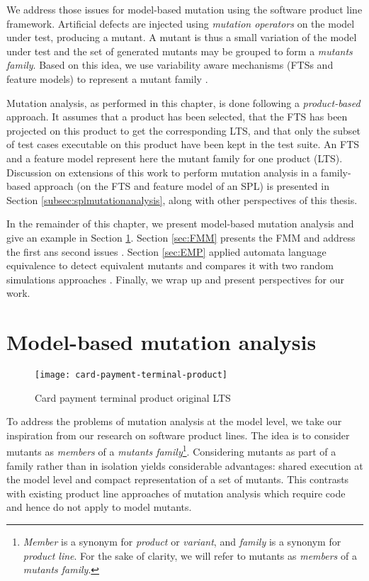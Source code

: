 We address those issues for model-based mutation using the software product line framework. Artificial defects are injected using \emph{mutation operators} on the model under test, producing a mutant. A mutant is thus a small variation of the model under test and the set of generated mutants may be grouped to form a \emph{mutants family}. Based on this idea, we use variability aware mechanisms (FTSs and feature models) to represent a mutant family \cite{Devroey2016a,Devroey2014f}. 

Mutation analysis, as performed in this chapter, is done following a \emph{product-based} approach. It assumes that a product has been selected, that the FTS has been projected on this product to get the corresponding \gls{LTS}, and that only the subset of test cases executable on this product have been kept in the test suite. An \gls{FTS} and a \gls{feature model} represent here the mutant family for one product (\ie LTS). Discussion on extensions of this work to perform mutation analysis in a family-based approach (\ie on the FTS and feature model of an SPL) is presented in Section \ref{subsec:splmutationanalysis}, along with other perspectives of this thesis.

In the remainder of this chapter, we present model-based mutation analysis and give an example in Section \ref{sec:MBMA}. Section \ref{sec:FMM} presents the \acrfull{FMM} and address the first ans second issues \cite{Devroey2016a}. Section \ref{sec:EMP} applied automata language equivalence to detect equivalent mutants and compares it with two random simulations approaches \cite{Devroey2017}. Finally, we wrap up and present perspectives for our work. 

\section{Model-based mutation analysis}

\label{sec:MBMA}

\begin{figure}[t]
	\centering
	\texttt{[image: card-payment-terminal-product]}
	\caption{Card payment terminal product original LTS}
	\label{fig:fmm:cptproduct}
\end{figure}

To address the problems of mutation analysis at the model level, we take our inspiration from our research on software product lines. The idea is to consider mutants as \emph{members} of a \emph{mutants family}\footnote{\textit{Member} is a synonym for \textit{product} or \textit{variant}, and \emph{family} is a synonym for \textit{product line}. For the sake of clarity, we will refer to mutants as \textit{members} of a \textit{mutants family}.}. Considering mutants as part of a family rather than in isolation yields considerable advantages: shared execution at the model level \cite{Classen2013b} and compact representation of a set of mutants. This contrasts with existing product line approaches of mutation analysis \cite{Kim2013a,Nguyen2014,Kim2012a} which require code and hence do not apply to model mutants.


